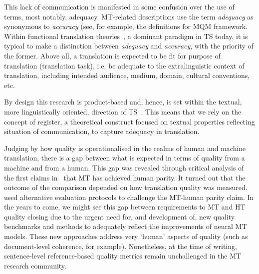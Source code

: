 This lack of communication is manifested in some confusion over the use of terms, most notably, adequacy. MT-related descriptions use the term \textit{adequacy} as synonymous to \textit{accuracy} (see, for example, the definitions for \gls{MQM} framework. Within functional translation theories~\cite[represented, for example, by][who developed the \textit{Scopos} theory by~\citet{Reiss1984}]{Nord1997,Vermeer1989}, a dominant paradigm in TS today, it is typical to make a distinction between \textit{adequacy} and \textit{accuracy}, with the priority of the former. Above all, a translation is expected to be fit for purpose of translation (translation task), i.e. be adequate to the extralinguistic context of translation, including intended audience, medium, domain, cultural conventions, etc.

By design this research is product-based and, hence, is set within the textual, more linguistically oriented, direction of TS~\cite[as opposed to cognitive, cultural and sociological branches, following disciplinary map of TS in][]{Chesterman2005}. This means that we rely on the concept of register, a theoretical construct focused on textual properties reflecting situation of communication, to capture adequacy in translation. 

Judging by how quality is operationalised in the realms of human and machine translation, there is a gap between what is expected in terms of quality from a machine and from a human. 
This gap was revealed through critical analysis of the first claims in~\citet{Hassan2018} that MT has achieved human parity. It turned out that the outcome of the comparison depended on how translation quality was measured. \citet{Laubli2018} used alternative evaluation protocols to challenge the MT-human parity claim.
In the years to come, we might see this gap between requirements to MT and HT quality closing due to the urgent need for, and development of, new quality benchmarks and methods to adequately reflect the improvements of neural MT models. These new approaches address very `human' aspects of quality (such as document-level coherence, for example). Nonetheless, at the time of writing, sentence-level reference-based quality metrics remain unchallenged in the MT research community.


